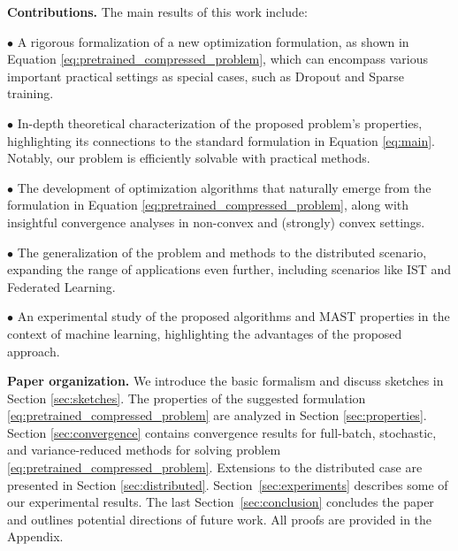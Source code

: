\documentclass{article}
\theoremstyle{plain}
\theoremstyle{plain}
\theoremstyle{definition}
\theoremstyle{remark}
\begin{document}
\textbf{Contributions.}
The main results of this work include:

$\bullet$ A rigorous formalization of a new optimization formulation, as shown in Equation \eqref{eq:pretrained_compressed_problem}, which can encompass various important practical settings as special cases, such as Dropout and Sparse training.

$\bullet$ In-depth theoretical characterization of the proposed problem's properties, highlighting its connections to the standard formulation in Equation \eqref{eq:main}. Notably, our problem is efficiently solvable with practical methods.

$\bullet$ The development of optimization algorithms that naturally emerge from the formulation in Equation \eqref{eq:pretrained_compressed_problem}, along with insightful convergence analyses in non-convex and (strongly) convex settings.

$\bullet$ The generalization of the problem and methods to the distributed scenario, expanding the range of applications even further, including scenarios like IST and Federated Learning.

$\bullet$ An experimental study of the proposed algorithms and MAST properties in the context of machine learning, highlighting the advantages of the proposed approach.

\textbf{Paper organization.} We introduce the basic formalism and discuss sketches in Section \ref{sec:sketches}. The properties of the suggested formulation \eqref{eq:pretrained_compressed_problem} are analyzed in Section \ref{sec:properties}. Section \ref{sec:convergence} contains convergence results for full-batch, stochastic, and variance-reduced methods for solving problem \eqref{eq:pretrained_compressed_problem}. Extensions to the distributed case are presented in Section \ref{sec:distributed}. Section~\ref{sec:experiments} describes some of our experimental results.
The last Section~\ref{sec:conclusion} concludes the paper and outlines potential directions of future work. All proofs are provided in the Appendix.
\end{document}
